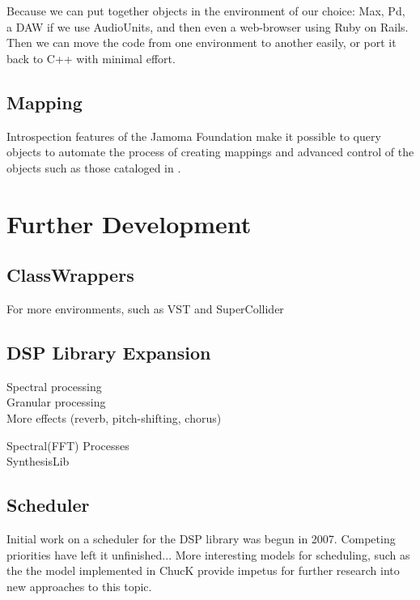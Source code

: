 \documentclass[twoside,10pt]{article}
\begin{document}
Because we can put together objects in the environment of our choice: Max, Pd, a DAW if we use AudioUnits, and then even a web-browser using Ruby on Rails.  Then we can move the code from one environment to another easily, or port it back to C++ with minimal effort.

\subsection{Mapping}

Introspection features of the Jamoma Foundation make it possible to query objects to automate the process of creating mappings and advanced control of the objects such as those cataloged in \cite{Pendharkar:2006}.  




\section{Further Development} %


\subsection{ClassWrappers}

For more environments, such as VST and SuperCollider

\subsection{DSP Library Expansion}

Spectral processing \\

Granular processing   \\

More effects (reverb, pitch-shifting, chorus) 


Spectral(FFT) Processes\\

SynthesisLib

\subsection{Scheduler}

Initial work on a scheduler for the DSP library was begun in 2007.  Competing priorities have left it unfinished...  More interesting models for scheduling, such as the the model implemented in ChucK provide impetus for further research into new approaches to this topic.
\end{document}
